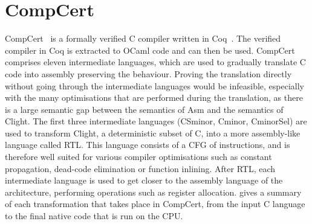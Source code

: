 \section{CompCert}%
\label{sec:bg:compcert}

\gls{CompCert}~\cite{leroy06_formal_certif_compil_back_end,leroy09_formal_verif_realis_compil,leroy16_cfvoc}
is a formally verified C compiler written in
Coq~\cite{bertot04_inter_theor_provin_progr_devel}.  The verified compiler in
Coq is extracted to OCaml code and can then be used.  CompCert comprises eleven
intermediate languages, which are used to gradually translate C code into
assembly preserving the behaviour.  Proving the translation directly without
going through the intermediate languages would be infeasible, especially with
the many optimisations that are performed during the translation, as there is a
large semantic gap between the semantics of \gls{Asm} and the semantics of
\gls{Clight}.  The first three intermediate languages (\gls{CSminor},
\gls{Cminor}, \gls{CminorSel}) are used to transform \gls{Clight}, a
deterministic subset of C, into a more assembly-like language called \gls{RTL}.
This language consists of a \gls{CFG} of instructions, and is therefore well
suited for various compiler optimisations such as constant propagation,
dead-code elimination or function inlining.  After \gls{RTL}, each intermediate
language is used to get closer to the assembly language of the architecture,
performing operations such as register allocation.
 gives a summary of each transformation that
takes place in CompCert, from the input C language to the final native code that
is run on the \gls{CPU}.



